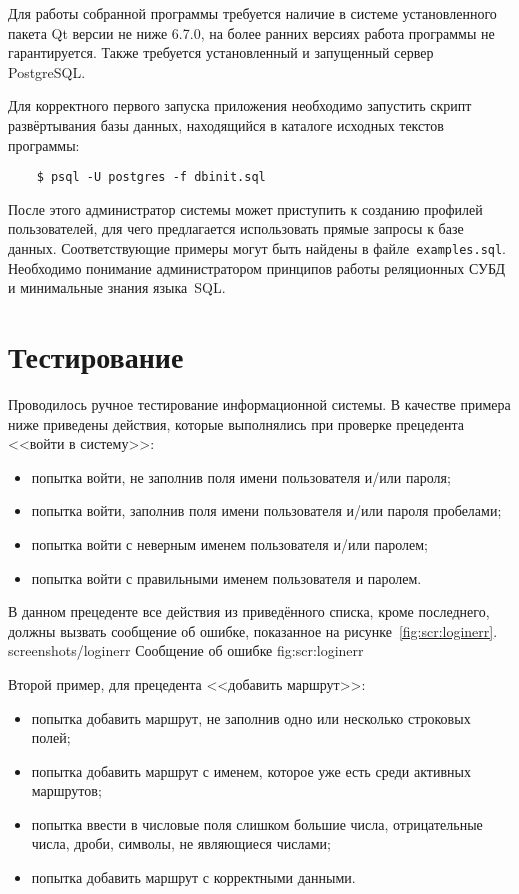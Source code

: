 Для работы собранной программы требуется наличие в системе
установленного пакета Qt версии не ниже 6.7.0, на более ранних
версиях работа программы не гарантируется. Также требуется
установленный и запущенный сервер PostgreSQL.

Для корректного первого запуска приложения необходимо запустить 
скрипт развёртывания базы данных, находящийся
в каталоге исходных текстов программы:

\begin{lstlisting}
    $ psql -U postgres -f dbinit.sql 
\end{lstlisting}

После этого администратор системы может приступить к 
созданию профилей пользователей, для чего предлагается 
использовать прямые запросы к базе данных. 
Соответствующие примеры могут быть найдены в файле~\texttt{examples.sql}. 
Необходимо понимание администратором принципов работы 
реляционных СУБД и минимальные знания языка~SQL.


\section{Тестирование}
Проводилось ручное тестирование информационной системы. В качестве 
примера ниже приведены действия, которые выполнялись при проверке 
прецедента <<войти в систему>>:
\begin{itemize}
    \item попытка войти, не заполнив поля имени пользователя и/или пароля;
    \item попытка войти, заполнив поля имени пользователя и/или пароля пробелами;
    \item попытка войти с неверным именем пользователя и/или паролем;
    \item попытка войти с правильными именем пользователя и паролем.
\end{itemize}

В данном прецеденте все действия из приведённого списка, кроме последнего, должны
вызвать сообщение об ошибке, показанное на рисунке~\ref{fig:scr:loginerr}.
\image
    {screenshots/loginerr}
    {Сообщение об ошибке}
    {fig:scr:loginerr}

\newpage
Второй пример, для прецедента <<добавить маршрут>>:
\begin{itemize}
    \item попытка добавить маршрут, не заполнив одно или 
        несколько строковых полей;
    \item попытка добавить маршрут с именем, которое уже есть среди
        активных маршрутов;
    \item попытка ввести в числовые поля слишком большие числа,
        отрицательные числа, дроби, символы, не являющиеся числами;
    \item попытка добавить маршрут с корректными данными.
\end{itemize}

